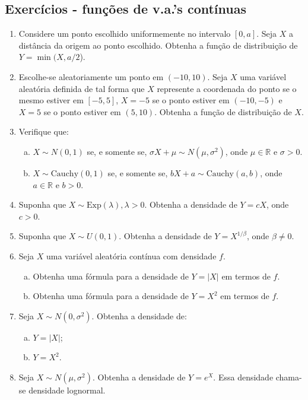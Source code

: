 \documentclass[../Notas.tex]{subfiles}
\begin{document}
\subsection{Exercícios - funções de v.a.'s contínuas}

\begin{enumerate}
    \item Considere um ponto escolhido uniformemente no intervalo $[0, a]$. Seja $X$ a distância da origem ao ponto escolhido. Obtenha a função de distribuição de $Y = \min(X, a/2$).
    \item Escolhe-se aleatoriamente um ponto em $(-10, 10)$. Seja $X$ uma variável aleatória definida de tal forma que $X$ represente a coordenada do ponto se o mesmo estiver em $[-5, 5]$, $X = -5$ se o ponto estiver em $(-10, -5)$ e $X = 5$ se o ponto estiver em $(5, 10)$. Obtenha a função de distribuição de $X$.
    \item Verifique que:
    \begin{enumerate}[a)]
    \item $X\sim N(0,1)$ se, e somente se, $\sigma X + \mu \sim N(\mu, \sigma^2)$, onde $\mu \in \mathbb{R}$ e $\sigma > 0$.
    \item $X\sim\text{Cauchy}(0, 1)$ se, e somente se, $bX + a \sim \text{Cauchy}(a, b)$, onde $a\in\mathbb{R}$ e $b > 0$.
    \end{enumerate}
    \item Suponha que $X\sim\text{Exp}(\lambda), \lambda > 0$. Obtenha a densidade de $Y = cX$, onde $c > 0$.
    \item Suponha que $X\sim U(0, 1)$. Obtenha a densidade de $Y = X^{1/\beta}$, onde $\beta \neq 0$.
    \item Seja $X$ uma variável aleatória contínua com densidade $f$.
    \begin{enumerate}[a)]
    \item Obtenha uma fórmula para a densidade de $Y = |X|$ em termos de $f$.
    \item Obtenha uma fórmula para a densidade de $Y = X^2$ em termos de $f$.
    \end{enumerate}
    \item Seja $X\sim N(0,\sigma^2)$. Obtenha a densidade de:
    \begin{enumerate}[a)]
    \item $Y = |X|$;
    \item $Y = X^2$.
    \end{enumerate}
    \item Seja $X\sim N(\mu, \sigma^2)$. Obtenha a densidade de $Y = e^X$. Essa densidade chama-se densidade lognormal.

\end{enumerate}
\end{document}
